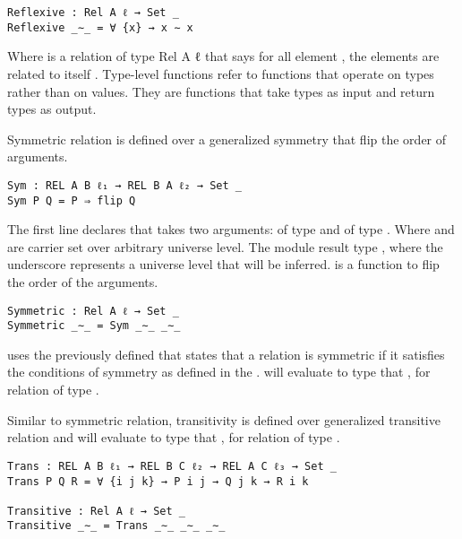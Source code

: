 \begin{verbatim}
Reflexive : Rel A ℓ → Set _
Reflexive _∼_ = ∀ {x} → x ∼ x
\end{verbatim}

Where  is a relation of type {Rel A ℓ} that says for all element
, the elements are related to itself . Type-level
functions refer to functions that operate on types rather than on values. They
are functions that take types as input and return types as output.

Symmetric relation is defined over a generalized symmetry that flip the order of arguments.

\begin{verbatim}
Sym : REL A B ℓ₁ → REL B A ℓ₂ → Set _
Sym P Q = P ⇒ flip Q
\end{verbatim}
The first line declares  that takes two arguments:  of
type  and  of type . Where
 and  are carrier set over arbitrary universe level. The
module result type , where the underscore represents a universe
level that will be inferred.  is a function to flip the order of
the arguments. 

\begin{verbatim}
Symmetric : Rel A ℓ → Set _
Symmetric _∼_ = Sym _∼_ _∼_
\end{verbatim}

 uses the previously defined  that states that a
relation  is symmetric if it satisfies the conditions of symmetry as
defined in the .  will evaluate to type that
,  for relation  of type
.

Similar to symmetric relation, transitivity is defined over generalized
transitive relation and  will evaluate to type that ,  for relation  of type
.

\begin{verbatim}
Trans : REL A B ℓ₁ → REL B C ℓ₂ → REL A C ℓ₃ → Set _
Trans P Q R = ∀ {i j k} → P i j → Q j k → R i k

Transitive : Rel A ℓ → Set _
Transitive _∼_ = Trans _∼_ _∼_ _∼_
\end{verbatim}

